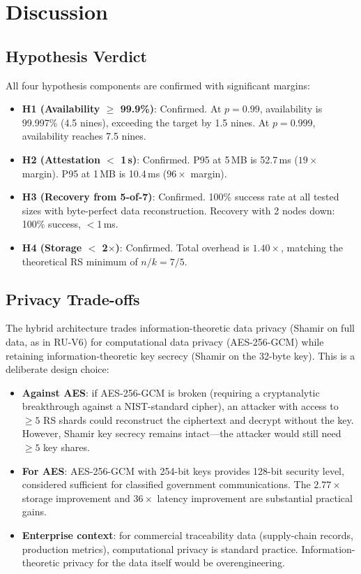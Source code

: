 
\section{Discussion}
\label{sec:discussion}

\subsection{Hypothesis Verdict}

All four hypothesis components are confirmed with significant margins:

\begin{itemize}
  \item \textbf{H1 (Availability $\geq$ 99.9\%)}: Confirmed. At
    $p = 0.99$, availability is 99.997\% (4.5 nines), exceeding the
    target by 1.5 nines. At $p = 0.999$, availability reaches 7.5 nines.
  \item \textbf{H2 (Attestation $<$ 1\,s)}: Confirmed. P95 at 5\,MB is
    52.7\,ms ($19\times$ margin). P95 at 1\,MB is 10.4\,ms ($96\times$
    margin).
  \item \textbf{H3 (Recovery from 5-of-7)}: Confirmed. 100\% success
    rate at all tested sizes with byte-perfect data reconstruction.
    Recovery with 2 nodes down: 100\% success, $<$1\,ms.
  \item \textbf{H4 (Storage $<$ 2$\times$)}: Confirmed. Total overhead
    is $1.40\times$, matching the theoretical RS minimum of $n/k = 7/5$.
\end{itemize}

\subsection{Privacy Trade-offs}

The hybrid architecture trades information-theoretic data privacy (Shamir
on full data, as in RU-V6) for computational data privacy (AES-256-GCM)
while retaining information-theoretic key secrecy (Shamir on the 32-byte
key). This is a deliberate design choice:

\begin{itemize}
  \item \textbf{Against AES}: if AES-256-GCM is broken (requiring a
    cryptanalytic breakthrough against a NIST-standard cipher), an
    attacker with access to $\geq 5$ RS shards could reconstruct the
    ciphertext and decrypt without the key. However, Shamir key secrecy
    remains intact---the attacker would still need $\geq 5$ key shares.
  \item \textbf{For AES}: AES-256-GCM with 254-bit keys provides
    128-bit security level, considered sufficient for classified
    government communications. The $2.77\times$ storage improvement and
    $36\times$ latency improvement are substantial practical gains.
  \item \textbf{Enterprise context}: for commercial traceability data
    (supply-chain records, production metrics), computational privacy is
    standard practice. Information-theoretic privacy for the data itself
    would be overengineering.
\end{itemize}

